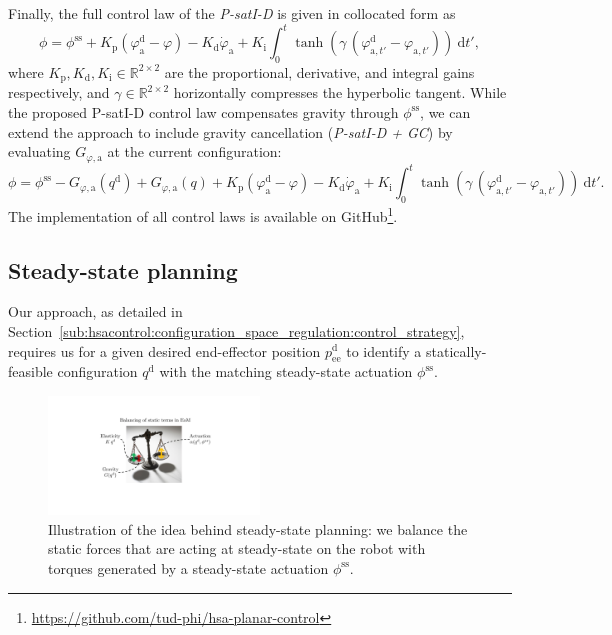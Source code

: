% 
Finally, the full control law of the \emph{P-satI-D} is given in collocated form as
\begin{equation}\label{eq:hsacontrol:gravity_compensation_controller}
    \phi = \phi^\mathrm{ss} + K_\mathrm{p} (\varphi_\mathrm{a}^\mathrm{d} - \varphi) - K_\mathrm{d} \dot{\varphi}_\mathrm{a} + K_\mathrm{i} \int_0^t \tanh(\gamma \, ( \varphi_{\mathrm{a},t'}^\mathrm{d}-\varphi_{\mathrm{a},t'})) \: \mathrm{d} t',
\end{equation}
where $K_\mathrm{p}, K_\mathrm{d}, K_\mathrm{i} \in \mathbb{R}^{2 \times 2}$ are the proportional, derivative, and integral gains respectively, and $\gamma \in \mathbb{R}^{2 \times 2}$ horizontally compresses the hyperbolic tangent. While the proposed P-satI-D control law compensates gravity through $\phi^\mathrm{ss}$, we can extend the approach to include gravity cancellation (\emph{P-satI-D + GC}) by evaluating $G_{\varphi,\mathrm{a}}$ at the current configuration:
\begin{equation}\label{eq:hsacontrol:gravity_cancellation_controller}
    \phi = \phi^\mathrm{ss} - G_{\varphi,\mathrm{a}}(q^\mathrm{d}) + G_{\varphi,\mathrm{a}}(q) + K_\mathrm{p} (\varphi_\mathrm{a}^\mathrm{d} - \varphi) - K_\mathrm{d} \dot{\varphi}_\mathrm{a} + K_\mathrm{i} \int_0^t \tanh(\gamma \, ( \varphi_{\mathrm{a},t'}^\mathrm{d}-\varphi_{\mathrm{a},t'})) \: \mathrm{d} t'.
\end{equation}
The implementation of all control laws is available on GitHub\footnote{\url{https://github.com/tud-phi/hsa-planar-control}}.

\subsection{Steady-state planning}\label{sub:hsacontrol:experiments:steady_state_planning}
Our approach, as detailed in Section~\ref{sub:hsacontrol:configuration_space_regulation:control_strategy}, requires us for a given desired end-effector position $p_\mathrm{ee}^\mathrm{d}$ to identify a statically-feasible configuration $q^\mathrm{d}$ with the matching steady-state actuation $\phi^\mathrm{ss}$.

\begin{figure}[hbt]
    \centering
\includegraphics[width=0.5\textwidth]{hsacontrol/figures/control_schemes/configuration_space_regulation/steady_state_planning_cropped.pdf}
    \caption{Illustration of the idea behind steady-state planning: we balance the static forces that are acting at steady-state on the robot with torques generated by a steady-state actuation $\phi^\mathrm{ss}$.}
    \label{fig:hsacontrol:configuration_space_regulation:steady_state_planning}
\end{figure}


